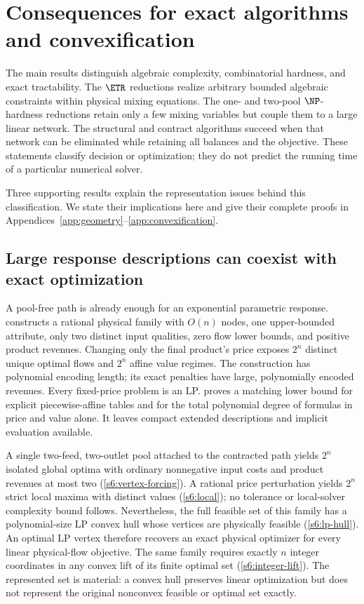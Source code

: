 \section{Consequences for exact algorithms and convexification}\label{s6:synthesis}

The main results distinguish algebraic complexity, combinatorial hardness,
and exact tractability. The $\ETR$ reductions realize arbitrary bounded
algebraic constraints within physical mixing equations. The one- and two-pool
$\NP$-hardness reductions retain only a few mixing variables but couple
them to a large linear network. The structural and contract algorithms
succeed when that network can be eliminated while retaining all balances
and the objective. These statements classify decision or optimization;
they do not predict the running time of a particular numerical solver.

Three supporting results explain the representation issues behind this
classification. We state their implications here and give their complete
proofs in Appendices~\ref{app:geometry}--\ref{app:convexification}.

\subsection{Large response descriptions can coexist with exact optimization}
A pool-free path is already enough for an exponential parametric response.
 constructs a rational physical family with
$O(n)$ nodes, one upper-bounded attribute, only two distinct input
qualities, zero flow lower bounds, and positive product revenues.
Changing only the final product's price exposes $2^n$ distinct unique
optimal flows and $2^n$ affine value regimes. The construction has
polynomial encoding length; its exact penalties have large, polynomially
encoded revenues. Every fixed-price problem is an LP.
 proves a matching lower bound for explicit
piecewise-affine tables and for the total polynomial degree of formulas
in price and value alone. It leaves compact extended descriptions and
implicit evaluation available.

A single two-feed, two-outlet pool attached to the contracted path yields
$2^n$ isolated global optima with ordinary nonnegative input costs and
product revenues at most two (\cref{s6:vertex-forcing}). A rational price
perturbation yields $2^n$ strict local maxima with distinct values
(\cref{s6:local}); no tolerance or local-solver complexity bound follows.
Nevertheless, the full feasible set of this family has a polynomial-size
LP convex hull whose vertices are physically feasible
(\cref{s6:lp-hull}). An optimal LP vertex therefore recovers an exact
physical optimizer for every linear physical-flow objective. The same
family requires exactly $n$ integer coordinates in any convex lift of
its finite optimal set (\cref{s6:integer-lift}). The represented set is
material: a convex hull preserves linear optimization but does not
represent the original nonconvex feasible or optimal set exactly.

